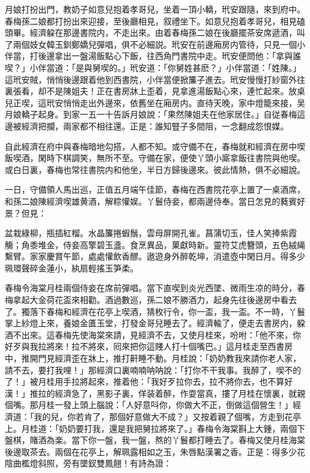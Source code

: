 月娘打扮出門，教奶子如意兒抱着孝哥兒，坐着一頂小轎，玳安跟隨，來到府中。春梅孫二娘都打扮出來迎接，至後廳相見，叙禮坐下。如意兒抱着孝哥兒，相見磕頭畢。經濟躱在那邊書院内，不走出來。由着春梅孫二娘在後廳擺茶安席遞酒，叫了兩個妓女韓玉釧鄭嬌兒彈唱，俱不必細説。玳安在前邊廂房内管待，只見一個小伴當，打後邊拿出一盤湯飯點心下飯，往西角門書院中走。玳安便問他：「拿與誰喫？」小伴當道：「是與舅喫的。」玳安道：「你舅姓甚麽？」小伴當道：「姓陳。」這玳安賊，悄悄後邊跟着他到西書院，小伴當便掀簾子進去。玳安慢慢打紗窗外往裏張看，却不是陳姐夫！正在書房牀上歪着，見拿進湯飯點心來，連忙起來。放桌兒正喫，這玳安悄悄走出外邊來，依舊坐在廂房内。直待天晚，家中燈籠來接，吴月娘轎子起身。到家一五一十告訴月娘說：「果然陳姐夫在他家居住。」自従春梅這邊被經濟把攔，兩家都不相往還。正是：誰知豎子多間阻，一念翻成怨恨媒。

自此經濟在府中與春梅暗地勾搭，人都不知。或守備不在，春梅就和經濟在房中喫飯喫酒，閑時下棋調笑，無所不至。守備在家，便使丫頭小廝拿飯往書院與他喫。或白日裏，春梅也常往書院内和他坐，半日方歸後邊來。彼此情熱，俱不必細說。

一日，守備領人馬出巡，正值五月端午佳節，春梅在西書院花亭上置了一桌酒席，和孫二娘陳經濟喫雄黄酒，解粽懽娱。丫鬟侍妾，都兩邊侍奉。當日怎見的蕤賓好景？但見：

盆栽綠柳，瓶插紅榴。水晶簾捲蝦鬚，雲母屏開孔雀。菖蒲切玉，佳人笑捧紫霞觴；角黍堆金，侍妾高擎碧玉盞。食烹異品，菓獻時新。靈符艾虎簪頭，五色絨䋲繫臂。家家慶賞午節，處處懽飲香醪。遨遊身外醉乾坤，消遣壺中閑日月。得多少珮環聲碎金蓮小，紈扇輕搖玉笋柔。

春梅令海棠月桂兩個侍妾在席前彈唱。當下直喫到炎光西墜、微雨生凉的時分，春梅拿起大金荷花盃來相勸。酒過數巡，孫二娘不勝酒力，起身先往後邊房中看去了。獨落下春梅和經濟在花亭上喫酒，猜枚行令，你一盃，我一盃。不一時，丫鬟掌上紗燈上來，養娘金匱玉堂，打發金哥兒睡去了。經濟輸了，便走去書房内，躱酒不出來。這春梅先使海棠來請，見經濟不去，又使月桂來，吩咐：「他不來，你好歹與我拉將來！拉不將來，囘來把你這賤人打十個嘴巴。」這月桂走至西書房中，推開門見經濟歪在牀上，推打鼾睡不動。月桂說：「奶奶教我來請你老人家，請不去，要打我哩！」那經濟口裏喃喃呐呐說：「打你不干我事。我醉了，喫不的了！」被月桂用手拉將起來，推着他：「我好歹拉你去，拉不將你去，也不算好漢！」推拉的經濟急了，黑影子裏，佯装着醉，作耍當真，摟了月桂在懷裏，就親個嘴。那月桂一發上頭上腦說：「人好意呌你，你做大不正，倒做這個營生！」經濟道：「我的兒，你若肯了，那個好意做大不成？」又按着親了個嘴，方走到花亭上。月桂道：「奶奶要打我，還是我把舅拉將來了。」春梅令海棠斟上大鍾，兩個下盤棋，賭酒為楽。當下你一盤，我一盤，熬的丫鬟都打睡去了。春梅又使月桂海棠後邊取茶去。兩個在花亭上，解珮露相如之玉，朱唇點漢署之香。正是：得多少花陰曲檻燈斜照，旁有墜釵雙鳳翹！有詩為證：

